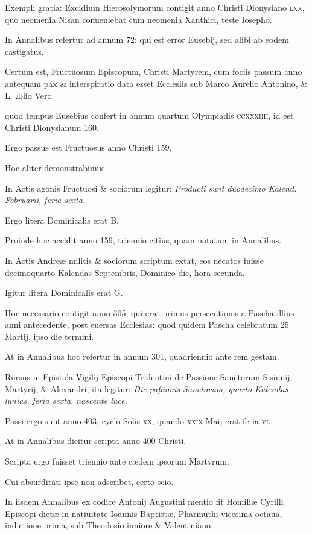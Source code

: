 \begin{parnumbers}
Exempli
gratia: Excidium Hierosolymorum contigit anno Christi
Dionysiano \textsc{lxx}, quo neomenia Nisan conueniebat cum neomenia
Xanthici, teste Iosepho.

In Annalibus refertur ad annum
72: qui est error Eusebij, sed alibi ab eodem castigatus.

Certum est, Fructuosum Episcopum, Christi Martyrem, cum fociis
passum anno antequam pax \& interspiratio data esset Ecclesiis
sub Marco Aurelio Antonino, \& L. Ælio Vero.

quod tempus Eusebius confert in annum quartum Olympiadis \textsc{ccxxxiiii},
id est Christi Dionysianum 160.

Ergo passus est Fructuosus anno Christi
159.

Hoc aliter demonstrabimus.

In Actis agonis Fructuosi \&
sociorum legitur: \textit{Producti sunt duodecimo Kalend. Februarii, feria
sexta.}

Ergo litera Dominicalis erat B.

Proinde hoc accidit anno
159, triennio citius, quam notatum in Annalibus.

In Actis Andreæ
militis \& sociorum scriptum extat, eos necatos fuisse decimoquarto
Kalendas Septembris, Dominico die, hora secunda.

Igitur litera Dominicalis erat G.

Hoc necessario contigit anno 305,
qui erat primus persecutionis a Pascha illius anni antecedente, post
euersas Ecclesias: quod quidem Pascha celebratum 25 Martij, ipso
die termini.

At in Annalibus hoc refertur in annum 301, quadriennio
ante rem gestam.

Rursus in Epistola Vigilij Episcopi Tridentini
de Passione Sanctorum Sisinnij, Martyrij, \& Alexandri,
ita legitur: \textit{Die paßionis Sanctorum, quarto Kalendas lunias, feria
sexta, nascente luce.}

Passi ergo sunt anno 403, cyclo Solis \textsc{xx}, quando
\textsc{xxix} Maij erat feria \textsc{vi}.

At in Annalibus dicitur scripta
anno 400 Christi.

Scripta ergo fuisset triennio ante cædem
ipsorum Martyrum.

Cui absurditati ipse non adscribet, certo scio.

In iisdem
Annalibus ex codice Antonij Augustini mentio fit Homiliæ
Cyrilli Episcopi dictæ in natiuitate Ioannis Baptistæ, Pharmuthi
vicesima octaua, indictione prima, sub Theodosio iuniore \& Valentiniano.


\end{parnumbers}
